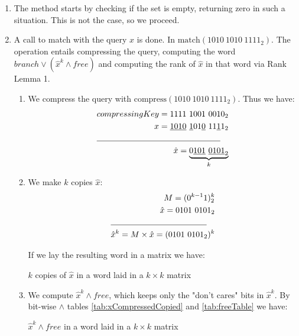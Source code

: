 \begin{enumerate}
    \item
    The method starts by checking if the set is empty, returning zero in such a situation. This is not the case, so we proceed.
    
    \item
    A call to {\ttfamily match} with the query $x$ is done. In $\text{match}(1010\ 1010\ 1111_2)$. The operation entails compressing the query, computing the word $branch \vee (\hat x^k \wedge free)$ and computing the rank of $\hat x$ in that word via Rank Lemma 1.
    \begin{enumerate}
        \item
        We compress the query with $\text{compress}(1010\ 1010\ 1111_2)$. Thus we have:
        \begin{align*}
            compressingKey = 1111\ 1001\ 0010_2\\
            x = \underline{1010}\ \underline{1}01\underline{0}\ 11\underline{1}1_2\\
            \cline{1-2}
            \hat x = \underbrace{0\underline{101}\ \underline{0101}_2}_k
        \end{align*}
        \item
        We make $k$ copies $\hat x$:
        \begin{align*}
            M = (0^{k-1}1)^k_2\\
            \hat x = 0101\ 0101_2\\
            \cline{1-2}
            \hat x^k = M \times \hat x = (0101\ 0101_2)^k\\
        \end{align*}
        
        If we lay the resulting word in a matrix we have:
        \begin{table}[H]
        \centering
        
        \caption[Example of a compressed key copied $k$ times and laid in a $k \times k$ matrix]{$k$ copies of $\hat x$ in a word laid in a $k \times k$ matrix}
        \label{tab:xCompressedCopied}
        \end{table}
        
        \item
        We compute $\hat x^k \wedge free$, which keeps only the "don't cares" bits in $\hat x^k$. By bit-wise $\wedge$ tables \ref{tab:xCompressedCopied} and \ref{tab:freeTable} we have:
        \begin{table}[H]
        \centering
        
        \caption[Example of $\hat x^k \wedge free$ in a word laid in a $k \times k$ matrix]{$\hat x^k \wedge free$ in a word laid in a $k \times k$ matrix}
        \label{tab:xCompressedANDfree}
        \end{table}
        

\end{enumerate}
\end{enumerate}
